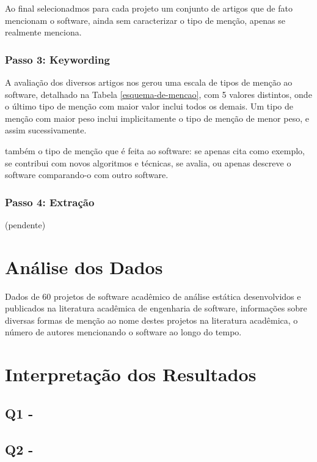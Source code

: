 Ao final selecionadmos para cada projeto um conjunto de artigos que de fato
mencionam o software, ainda sem caracterizar o tipo de menção, apenas se
realmente menciona.

\subsubsection{Passo 3: Keywording}

A avaliação dos diversos artigos nos gerou uma escala de tipos de menção ao
software, detalhado na Tabela \ref{esquema-de-mencao}, com 5 valores
distintos, onde o último tipo de menção com maior valor inclui todos os demais.
Um tipo de menção com maior peso inclui implicitamente o tipo de
menção de menor peso, e assim sucessivamente.

também o tipo de menção que é feita ao software: se apenas cita como exemplo,
se contribui com novos algoritmos e técnicas, se avalia, ou apenas descreve o
software comparando-o com outro software.

\subsubsection{Passo 4: Extração}

(pendente)



\section{Análise dos Dados} %

Dados de 60 projetos de software acadêmico de análise estática desenvolvidos e
publicados na literatura acadêmica de engenharia de software, informações sobre
diversas formas de menção ao nome destes projetos na literatura acadêmica,
o número de autores mencionando o software ao longo do tempo.

\section{Interpretação dos Resultados} %

\subsection{Q1 - \EstudoDoisQuestaoUm}


\subsection{Q2 - \EstudoDoisQuestaoDois}


